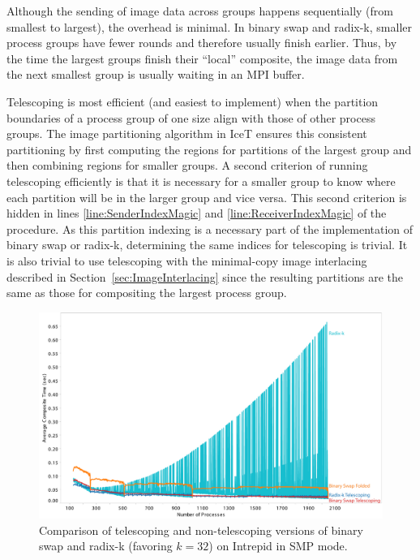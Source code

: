 \documentclass{acm_proc_article-sp}
\begin{document}
Although the sending of image data across groups happens sequentially (from
smallest to largest), the overhead is minimal.  In binary swap and radix-k,
smaller process groups have fewer rounds and therefore usually finish
earlier.  Thus, by the time the largest groups finish their ``local''
composite, the image data from the next smallest group is usually waiting
in an MPI buffer.

Telescoping is most efficient (and easiest to implement) when the partition
boundaries of a process group of one size align with those of other process
groups.  The image partitioning algorithm in IceT ensures this consistent
partitioning by first computing the regions for partitions of the largest
group and then combining regions for smaller groups.  A second criterion of
running telescoping efficiently is that it is necessary for a smaller group
to know where each partition will be in the larger group and vice versa.
This second criterion is hidden in lines \ref{line:SenderIndexMagic} and
\ref{line:ReceiverIndexMagic} of the  procedure.
As this partition indexing is a necessary part of the implementation of
binary swap or radix-k, determining the same indices for telescoping is
trivial.  It is also trivial to use telescoping with the minimal-copy image
interlacing described in Section~\ref{sec:ImageInterlacing} since the
resulting partitions are the same as those for compositing the largest
process group.

\begin{figure}[tbp]
  \centering
  \includegraphics[width=\linewidth]{images/TelescopeCompositeIntrepidSMP}
  \caption{Comparison of telescoping and non-telescoping versions of binary
    swap and radix-k (favoring $k=32$) on Intrepid in SMP mode.}
  \label{fig:TelescopeCompositeIntrepidSMP}
\end{figure}
\end{document}
